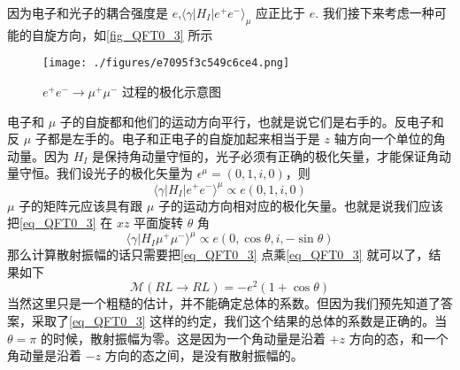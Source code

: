 因为电子和光子的耦合强度是 $e$,$\langle \gamma | H_I | e^+ e^- \rangle_\mu$ 应正比于 $e$. 我们接下来考虑一种可能的自旋方向，如\autoref{fig_QFT0_3} 所示
\begin{figure}[ht]
\centering
\texttt{[image: ./figures/e7095f3c549c6ce4.png]}
\caption{$e^+e^-\rightarrow\mu^+\mu^-$ 过程的极化示意图} \label{fig_QFT0_3}
\end{figure}
电子和 $\mu$ 子的自旋都和他们的运动方向平行，也就是说它们是右手的。反电子和反 $\mu$ 子都是左手的。电子和正电子的自旋加起来相当于是 $z$ 轴方向一个单位的角动量。因为 $H_I$ 是保持角动量守恒的，光子必须有正确的极化矢量，才能保证角动量守恒。我们设光子的极化矢量为 $\epsilon^\mu =(0,1,i,0)$，则
\begin{equation}
\langle \gamma | H_I | e^+ e^- \rangle^\mu \propto e (0,1,i ,0)
\end{equation}
$\mu$ 子的矩阵元应该具有跟 $\mu$ 子的运动方向相对应的极化矢量。也就是说我们应该把\autoref{eq_QFT0_3} 在 $xz$ 平面旋转 $\theta$ 角
\begin{equation}
\langle \gamma| H_I \mu^+\mu^-\rangle^\mu \propto e (0,\cos\theta, i, - \sin\theta) 
\end{equation}
那么计算散射振幅的话只需要把\autoref{eq_QFT0_3} 点乘\autoref{eq_QFT0_3} 就可以了，结果如下
\begin{equation}
\mathcal M(RL\rightarrow RL) = - e^2 (1+\cos\theta)
\end{equation}
当然这里只是一个粗糙的估计，并不能确定总体的系数。但因为我们预先知道了答案，采取了\autoref{eq_QFT0_3} 这样的约定，我们这个结果的总体的系数是正确的。当 $\theta = \pi$ 的时候，散射振幅为零。这是因为一个角动量是沿着 $+z$ 方向的态，和一个角动量是沿着 $-z$ 方向的态之间，是没有散射振幅的。

